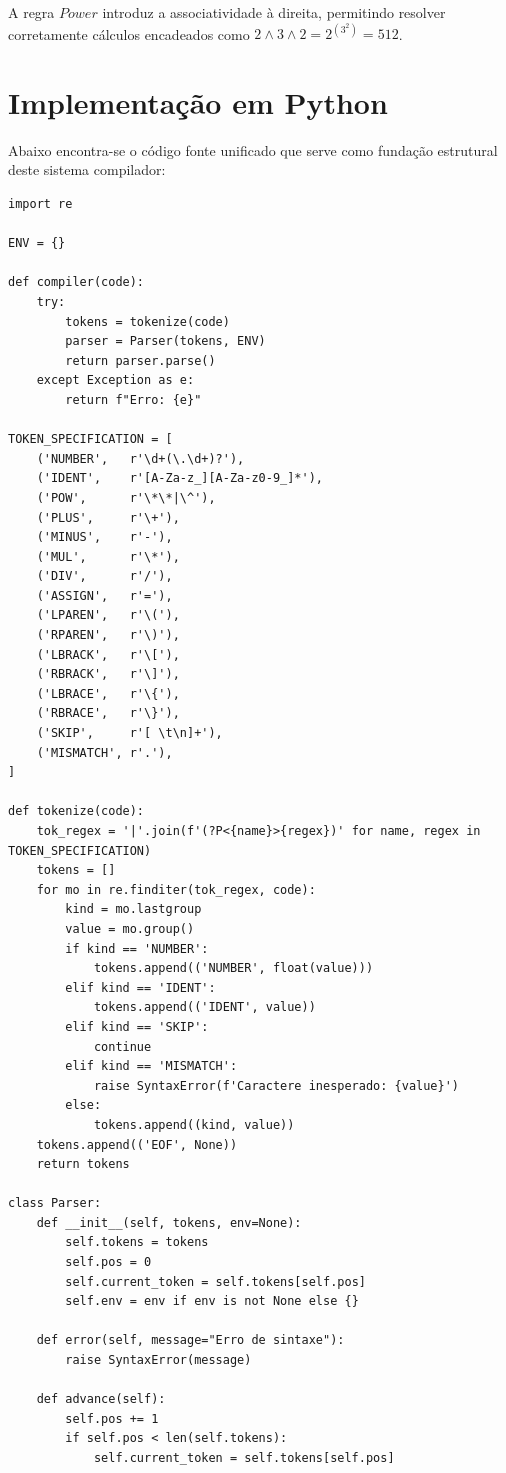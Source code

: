 \documentclass[12pt,a4paper]{article}
\begin{document}
A regra $\mathit{Power}$ introduz a associatividade à direita, permitindo resolver corretamente cálculos encadeados como $2 \wedge 3 \wedge 2 = 2^{(3^2)} = 512$.

\section{Implementação em Python}
Abaixo encontra-se o código fonte unificado que serve como fundação estrutural deste sistema compilador:

\begin{lstlisting}
import re

ENV = {}

def compiler(code):
    try:
        tokens = tokenize(code)
        parser = Parser(tokens, ENV)
        return parser.parse()
    except Exception as e:
        return f"Erro: {e}"

TOKEN_SPECIFICATION = [
    ('NUMBER',   r'\d+(\.\d+)?'),
    ('IDENT',    r'[A-Za-z_][A-Za-z0-9_]*'),
    ('POW',      r'\*\*|\^'),
    ('PLUS',     r'\+'),
    ('MINUS',    r'-'),
    ('MUL',      r'\*'),
    ('DIV',      r'/'),
    ('ASSIGN',   r'='),
    ('LPAREN',   r'\('),
    ('RPAREN',   r'\)'),
    ('LBRACK',   r'\['),
    ('RBRACK',   r'\]'),
    ('LBRACE',   r'\{'),
    ('RBRACE',   r'\}'),
    ('SKIP',     r'[ \t\n]+'),
    ('MISMATCH', r'.'),
]

def tokenize(code):
    tok_regex = '|'.join(f'(?P<{name}>{regex})' for name, regex in TOKEN_SPECIFICATION)
    tokens = []
    for mo in re.finditer(tok_regex, code):
        kind = mo.lastgroup
        value = mo.group()
        if kind == 'NUMBER':
            tokens.append(('NUMBER', float(value)))
        elif kind == 'IDENT':
            tokens.append(('IDENT', value))
        elif kind == 'SKIP':
            continue
        elif kind == 'MISMATCH':
            raise SyntaxError(f'Caractere inesperado: {value}')
        else:
            tokens.append((kind, value))
    tokens.append(('EOF', None))
    return tokens

class Parser:
    def __init__(self, tokens, env=None):
        self.tokens = tokens
        self.pos = 0
        self.current_token = self.tokens[self.pos]
        self.env = env if env is not None else {}

    def error(self, message="Erro de sintaxe"):
        raise SyntaxError(message)

    def advance(self):
        self.pos += 1
        if self.pos < len(self.tokens):
            self.current_token = self.tokens[self.pos]


\end{lstlisting}
\end{document}
